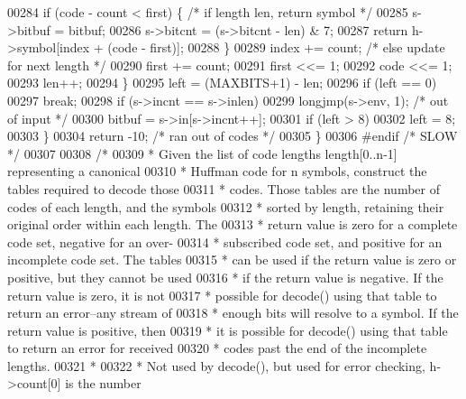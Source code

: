 \begin{DoxyCode}
00284             \textcolor{keywordflow}{if} (code - count < first) \{ \textcolor{comment}{/* if length len, return symbol */}
00285                 s->bitbuf = bitbuf;
00286                 s->bitcnt = (s->bitcnt - len) & 7;
00287                 \textcolor{keywordflow}{return} h->symbol[index + (code - first)];
00288             \}
00289             index += count;             \textcolor{comment}{/* else update for next length */}
00290             first += count;
00291             first <<= 1;
00292             code <<= 1;
00293             len++;
00294         \}
00295         left = (MAXBITS+1) - len;
00296         \textcolor{keywordflow}{if} (left == 0)
00297             \textcolor{keywordflow}{break};
00298         \textcolor{keywordflow}{if} (s->incnt == s->inlen)
00299             longjmp(s->env, 1);         \textcolor{comment}{/* out of input */}
00300         bitbuf = s->in[s->incnt++];
00301         \textcolor{keywordflow}{if} (left > 8)
00302             left = 8;
00303     \}
00304     \textcolor{keywordflow}{return} -10;                         \textcolor{comment}{/* ran out of codes */}
00305 \}
00306 \textcolor{preprocessor}{#endif }\textcolor{comment}{/* SLOW */}\textcolor{preprocessor}{}
00307 
00308 \textcolor{comment}{/*}
00309 \textcolor{comment}{ * Given the list of code lengths length[0..n-1] representing a canonical}
00310 \textcolor{comment}{ * Huffman code for n symbols, construct the tables required to decode those}
00311 \textcolor{comment}{ * codes.  Those tables are the number of codes of each length, and the symbols}
00312 \textcolor{comment}{ * sorted by length, retaining their original order within each length.  The}
00313 \textcolor{comment}{ * return value is zero for a complete code set, negative for an over-}
00314 \textcolor{comment}{ * subscribed code set, and positive for an incomplete code set.  The tables}
00315 \textcolor{comment}{ * can be used if the return value is zero or positive, but they cannot be used}
00316 \textcolor{comment}{ * if the return value is negative.  If the return value is zero, it is not}
00317 \textcolor{comment}{ * possible for decode() using that table to return an error--any stream of}
00318 \textcolor{comment}{ * enough bits will resolve to a symbol.  If the return value is positive, then}
00319 \textcolor{comment}{ * it is possible for decode() using that table to return an error for received}
00320 \textcolor{comment}{ * codes past the end of the incomplete lengths.}
00321 \textcolor{comment}{ *}
00322 \textcolor{comment}{ * Not used by decode(), but used for error checking, h->count[0] is the number}

\end{DoxyCode}
